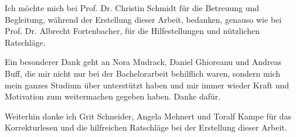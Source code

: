 \text{ }
\vspace{13.5cm}

Ich möchte mich bei Prof. Dr. Christin Schmidt für die Betreuung und Begleitung, während der Erstellung dieser Arbeit, bedanken, genauso wie bei Prof. Dr. Albrecht Fortenbacher, für die Hilfestellungen und nützlichen Ratschläge.

Ein besonderer Dank geht an Nora Mudrack, Daniel Ghioreanu und Andreas Buff, die mir nicht nur bei der Bachelorarbeit behilflich waren, sondern mich mein ganzes Studium über unterstützt haben und mir immer wieder Kraft und Motivation zum weitermachen gegeben haben. Danke dafür.

Weiterhin danke ich Grit Schneider, Angela Mehnert und Toralf Kampe für das Korrekturlesen und die hilfreichen Ratschläge bei der Erstellung dieser Arbeit.